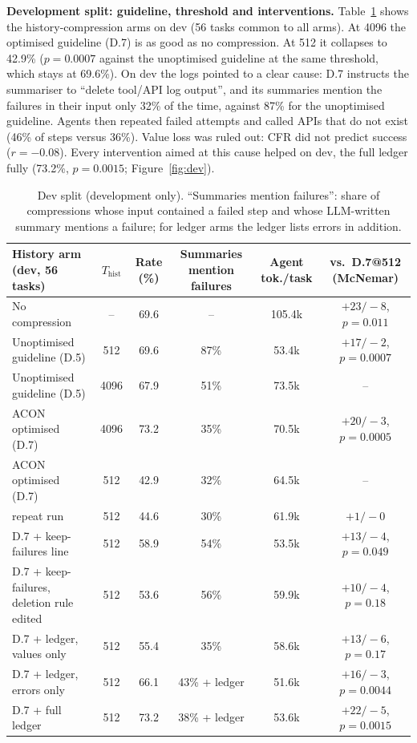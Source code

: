 \documentclass[10pt,a4paper]{article}
\begin{document}
\textbf{Development split: guideline, threshold and interventions.}
Table~\ref{tab:dev} shows the history-compression arms on dev (56 tasks common
to all arms). At 4096 the optimised guideline (D.7) is as good as no
compression. At 512 it collapses to 42.9\% ($p=0.0007$ against the
unoptimised guideline at the same threshold, which stays at 69.6\%). On dev the
logs pointed to a clear cause: D.7 instructs the summariser to ``delete
tool/API log output'', and its summaries mention the failures in their input
only 32\% of the time, against 87\% for the unoptimised guideline. Agents then
repeated failed attempts and called APIs that do not exist (46\% of steps
versus 36\%). Value loss was ruled out: CFR did not predict success
($r=-0.08$). Every intervention aimed at this cause helped on dev, the full
ledger fully (73.2\%, $p=0.0015$; Figure~\ref{fig:dev}).

\begin{table}[h]
\centering
\scriptsize
\renewcommand{\arraystretch}{1.12}
\setlength{\tabcolsep}{2.8pt}
\begin{tabular}{lccccc}
\toprule
\textbf{History arm (dev, 56 tasks)} & \textbf{$T_{\mathrm{hist}}$} & \textbf{Rate (\%)} &
\textbf{Summaries mention failures} & \textbf{Agent tok./task} & \textbf{vs.\ D.7@512 (McNemar)}\\
\midrule
No compression & -- & 69.6 & -- & 105.4k & $+23/-8$, $p=0.011$\\
Unoptimised guideline (D.5) & 512 & 69.6 & 87\% & 53.4k & $+17/-2$, $p=0.0007$\\
Unoptimised guideline (D.5) & 4096 & 67.9 & 51\% & 73.5k & --\\
ACON optimised (D.7) & 4096 & 73.2 & 35\% & 70.5k & $+20/-3$, $p=0.0005$\\
ACON optimised (D.7) & 512 & 42.9 & 32\% & 64.5k & --\\
\quad repeat run & 512 & 44.6 & 30\% & 61.9k & $+1/-0$\\
\midrule
D.7 + keep-failures line & 512 & 58.9 & 54\% & 53.5k & $+13/-4$, $p=0.049$\\
D.7 + keep-failures, deletion rule edited & 512 & 53.6 & 56\% & 59.9k & $+10/-4$, $p=0.18$\\
D.7 + ledger, values only & 512 & 55.4 & 35\% & 58.6k & $+13/-6$, $p=0.17$\\
D.7 + ledger, errors only & 512 & 66.1 & 43\% + ledger & 51.6k & $+16/-3$, $p=0.0044$\\
D.7 + full ledger & 512 & 73.2 & 38\% + ledger & 53.6k & $+22/-5$, $p=0.0015$\\
\bottomrule
\end{tabular}
\caption{Dev split (development only). ``Summaries mention failures'': share of
compressions whose input contained a failed step and whose LLM-written summary
mentions a failure; for ledger arms the ledger lists errors in addition.}
\label{tab:dev}
\end{table}
\end{document}
